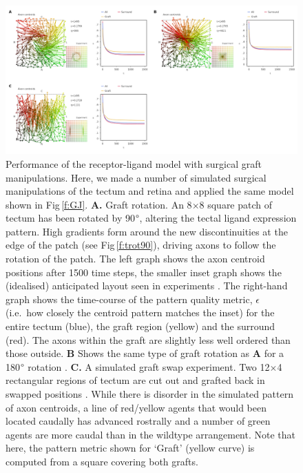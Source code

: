 \documentclass[9pt,lineno,draft]{elife}
\begin{document}
\begin{figure}
\begin{fullwidth}
\includegraphics[width=0.95\linewidth]{./images/fig_GJ_surgical_grafts.png}
\caption{Performance of the receptor-ligand model with surgical graft manipulations. Here, we made a number of simulated surgical manipulations of the tectum and retina and applied the same model shown in Fig\,\ref{f:GJ}. \textbf{A.} Graft rotation. An 8$\times$8 square patch of tectum has been rotated by 90$\degree$, altering the tectal ligand expression pattern. High gradients form around the new discontinuities at the edge of the patch (see Fig\,\ref{f:trot90}), driving axons to follow the rotation of the patch. The left graph shows the axon centroid positions after 1500 time steps, the smaller inset graph shows the (idealised) anticipated layout seen in experiments \citep{levine_deployment_1974}. The right-hand graph shows the time-course of the pattern quality metric, $\epsilon$ (i.e.~how closely the centroid pattern matches the inset) for the entire tectum (blue), the graft region (yellow) and the surround (red). The axons within the graft are slightly less well ordered than those outside. \textbf{B} Shows the same type of graft rotation as \textbf{A} for a 180$\degree$ rotation \citep{yoon_retention_1973}. \textbf{C.} A simulated graft swap experiment. Two 12$\times$4 rectangular regions of tectum are cut out and grafted back in swapped positions \citep{hope_arrow_1976,gaze_visuotectal_1983}. While there is disorder in the simulated pattern of axon centroids, a line of red/yellow agents that would been located caudally has advanced rostrally and a number of green agents are more caudal than in the wildtype arrangement. Note that here, the pattern metric shown for `Graft' (yellow curve) is computed from a square covering both grafts.}
\label{f:GJsurg_grafts}
\end{fullwidth}
\end{figure}
\end{document}
